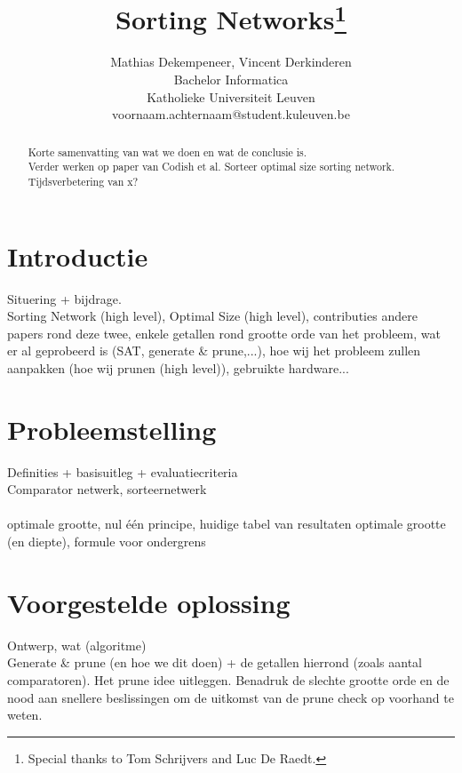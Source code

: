 \documentclass{article}
\title{Sorting Networks\thanks{Special thanks to Tom Schrijvers and Luc De Raedt.}}
\author{Mathias Dekempeneer, Vincent Derkinderen \\
Bachelor Informatica\\
Katholieke Universiteit Leuven \\
{voornaam.achternaam}@student.kuleuven.be}
\begin{document}
\maketitle

\begin{abstract}
Korte samenvatting van wat we doen en wat de conclusie is.\\
Verder werken op paper van Codish et al. Sorteer optimal size sorting network.\\ Tijdsverbetering van x?

\end{abstract}

\section{Introductie}
Situering + bijdrage.\\
Sorting Network (high level), Optimal Size (high level), contributies andere papers rond deze twee, enkele getallen rond grootte orde van het probleem, wat er al geprobeerd is (SAT, generate \& prune,...), hoe wij het probleem zullen aanpakken (hoe wij prunen (high level)), gebruikte hardware...

\section{Probleemstelling}
Definities + basisuitleg + evaluatiecriteria\\
Comparator netwerk, sorteernetwerk\\ \\
optimale grootte, nul \'e\'en principe, huidige tabel van resultaten optimale grootte (en diepte), formule voor ondergrens

\section{Voorgestelde oplossing}
Ontwerp, wat (algoritme)\\
Generate \& prune (en hoe we dit doen) + de getallen hierrond (zoals aantal comparatoren). Het prune idee uitleggen. Benadruk de slechte grootte orde en de nood aan snellere beslissingen om de uitkomst van de prune check op voorhand te weten.
\end{document}
